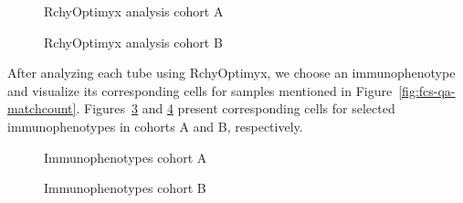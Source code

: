 \begin{figure}[!ht]
  \caption{RchyOptimyx analysis cohort A}
  \label{fig:fcs-qa-rchy1}
\end{figure}

\begin{figure}[!ht]
  \caption{RchyOptimyx analysis cohort B}
  \label{fig:fcs-qa-rchy2}
\end{figure}

After analyzing each tube using RchyOptimyx, we choose an immunophenotype and visualize its corresponding cells for samples mentioned in Figure~\ref{fig:fcs-qa-matchcount}. Figures~\ref{fig:fcs-qa-cells1} and \ref{fig:fcs-qa-cells2} present corresponding cells for selected immunophenotypes in cohorts A and B, respectively.

\begin{figure}[!ht]
  \caption{Immunophenotypes cohort A}
  \label{fig:fcs-qa-cells1}
\end{figure}

\begin{figure}[!ht]
  \caption{Immunophenotypes cohort B}
  \label{fig:fcs-qa-cells2}
\end{figure}


